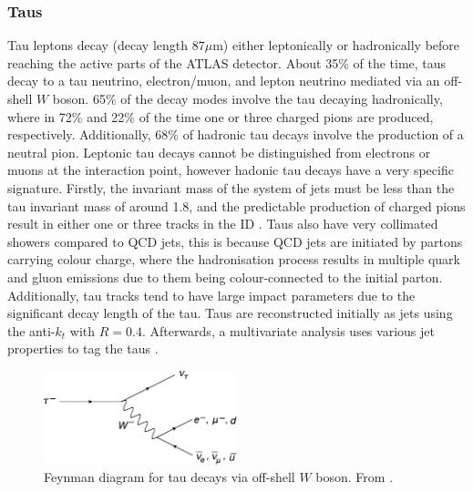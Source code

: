 \subsubsection{Taus}
Tau leptons decay (decay length $87\mu\text{m}$) either leptonically or hadronically before reaching the active parts of the ATLAS detector. About 35\% of the time, taus decay to a tau neutrino, electron/muon, and lepton neutrino mediated via an off-shell $W$ boson. 65\% of the decay modes involve the tau decaying hadronically, where in 72\% and 22\% of the time one or three charged pions are produced, respectively. Additionally, 68\% of hadronic tau decays involve the production of a neutral pion. Leptonic tau decays cannot be distinguished from electrons or muons at the interaction point, however hadonic tau decays have a very specific signature. Firstly, the invariant mass of the system of jets must be less than the tau invariant mass of around 1.8\GeV, and the predictable production of charged pions result in either one or three tracks in the ID \cite{Atlas:trackmultiplicity}. Taus also have very collimated showers compared to QCD jets, this is because QCD jets are initiated by partons carrying colour charge, where the hadronisation process results in multiple quark and gluon emissions due to them being colour-connected to the initial parton. Additionally, tau tracks tend to have large impact parameters due to the significant decay length of the tau. Taus are reconstructed initially as jets using the anti-$k_t$ with $R=0.4$. Afterwards, a multivariate analysis uses various jet properties to tag the taus \cite{Buckley:PCP,Atlas:tau}. 
\begin{figure}[t]
   \centering
   \includegraphics[width=0.5\textwidth]{plots/atlas/taudecay.pdf} 
   \caption{Feynman diagram for tau decays via off-shell $W$ boson. From \cite{Buckley:PCP}. \label{fig:taudecay}}
\end{figure}